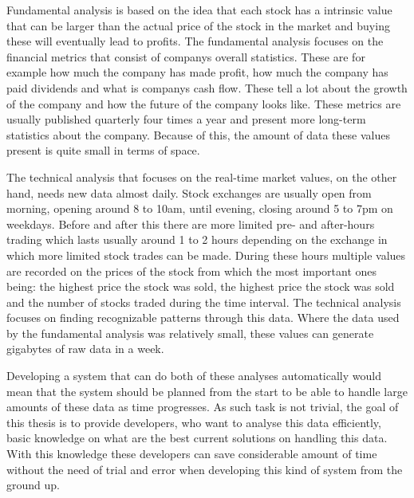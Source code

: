 \documentclass[article,11pt]{article}
\begin{document}
Fundamental analysis is based on the idea that each stock has a intrinsic value that can be larger than the actual price of the stock in the market and buying these will eventually lead to profits.\cite{sohnke}
The fundamental analysis focuses on the financial metrics that consist of companys overall statistics.
These are for example how much the company has made profit, how much the company has paid dividends and what is companys cash flow.
These tell a lot about the growth of the company and how the future of the company looks like.
These metrics are usually published quarterly four times a year and present more long-term statistics about the company.
Because of this, the amount of data these values present is quite small in terms of space.

The technical analysis that focuses on the real-time market values, on the other hand, needs new data almost daily.
Stock exchanges are usually open from morning, opening around 8 to 10am, until evening, closing around 5 to 7pm on weekdays.
Before and after this there are more limited pre- and after-hours trading which lasts usually around 1 to 2 hours depending on the exchange in which more limited stock trades can be made.
During these hours multiple values are recorded on the prices of the stock from which the most important ones being: the highest price the stock was sold, the highest price the stock was sold and the number of stocks traded during the time interval.
The technical analysis focuses on finding recognizable patterns through this data. \cite{murphy}
Where the data used by the fundamental analysis was relatively small, these values can generate gigabytes of raw data in a week.

Developing a system that can do both of these analyses automatically would mean that the system should be planned from the start to be able to handle large amounts of these data as time progresses.
As such task is not trivial, the goal of this thesis is to provide developers, who want to analyse this data efficiently, basic knowledge on what are the best current solutions on handling this data.
With this knowledge these developers can save considerable amount of time without the need of trial and error when developing this kind of system from the ground up.
\end{document}
